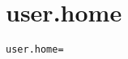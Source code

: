 \section{user.home}
\label{configuration:UserHome}
\ClearAPI
\TODO
\begin{lstlisting}[style=Props,caption={Usage example for \textit{user.home}}]
user.home=
\end{lstlisting}